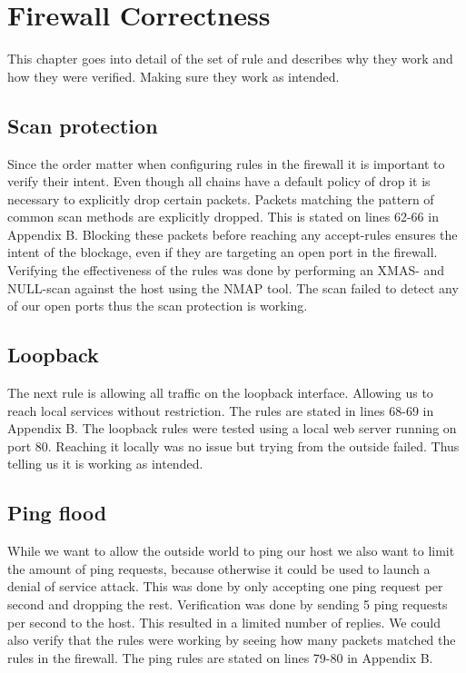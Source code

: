 \section{Firewall Correctness}
\label{sec:correctness}
This chapter goes into detail of the set of rule and describes why they work and how they were verified. Making sure they work as intended.

\subsection{Scan protection}
Since the order matter when configuring rules in the firewall it is important to verify their intent. Even though all chains have a default policy of drop it is necessary to explicitly drop certain packets. Packets matching the pattern of common scan methods are explicitly dropped. This is stated on lines 62-66 in Appendix B. Blocking these packets before reaching any accept-rules ensures the intent of the blockage, even if they are targeting an open port in the firewall. Verifying the effectiveness of the rules was done by performing an XMAS- and NULL-scan against the host using the NMAP tool. The scan failed to detect any of our open ports thus the scan protection is working.

\subsection{Loopback}
The next rule is allowing all traffic on the loopback interface. Allowing us to reach local services without restriction. The rules are stated in lines 68-69 in Appendix B. The loopback rules were tested using a local web server running on port 80. Reaching it locally was no issue but trying from the outside failed. Thus telling us it is working as intended.

\subsection{Ping flood}
While we want to allow the outside world to ping our host we also want to limit the amount of ping requests, because otherwise it could be used to launch a denial of service attack. This was done by only accepting one ping request per second and dropping the rest. Verification was done by sending 5 ping requests per second to the host. This resulted in a limited number of replies. We could also verify that the rules were working by seeing how many packets matched the rules in the firewall. The ping rules are stated on lines 79-80 in Appendix B.


